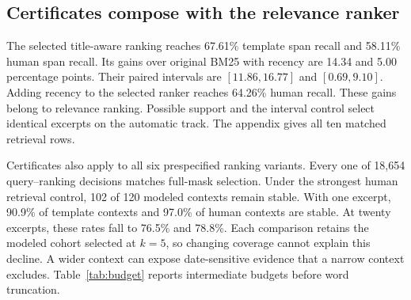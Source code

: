\subsection{Certificates compose with the relevance ranker}
The selected title-aware ranking reaches 67.61\% template span recall and 58.11\% human span recall.
Its gains over original BM25 with recency are 14.34 and 5.00 percentage points.
Their paired intervals are $[11.86,16.77]$ and $[0.69,9.10]$.
Adding recency to the selected ranker reaches 64.26\% human recall.
These gains belong to relevance ranking.
Possible support and the interval control select identical excerpts on the automatic track.
The appendix gives all ten matched retrieval rows.

Certificates also apply to all six prespecified ranking variants.
Every one of 18,654 query--ranking decisions matches full-mask selection.
Under the strongest human retrieval control, 102 of 120 modeled contexts remain stable.
With one excerpt, 90.9\% of template contexts and 97.0\% of human contexts are stable.
At twenty excerpts, these rates fall to 76.5\% and 78.8\%.
Each comparison retains the modeled cohort selected at $k=5$, so changing coverage cannot explain this decline.
A wider context can expose date-sensitive evidence that a narrow context excludes.
Table~\ref{tab:budget} reports intermediate budgets before word truncation.


